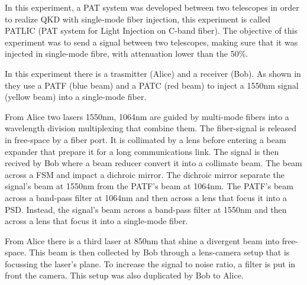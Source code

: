In this experiment, a PAT system was developed between two telescopes in order to realize QKD with single-mode fiber injection, this experiment is called PATLIC (PAT system for Light Injection on C-band fiber).
The objective of this experiment was to send a signal between two telescopes, making sure that it was injected in single-mode fibre, with attenuation lower than the 50\%.

In this experiment there is a trasmitter (Alice) and a receiver (Bob). As shown in  they use a PATF (blue beam) and a PATC (red beam) to inject a 1550nm signal (yellow beam) into a single-mode fiber.

From Alice two lasers 1550nm, 1064nm are guided by multi-mode fibers into a wavelength division multiplexing that combine them. The fiber-signal is released in free-space by a fiber port. It is collimated by a lens before entering a beam expander that prepare it for a long communications link. The signal is then recived by Bob where a beam reducer convert it into a collimate beam. The beam across a FSM and impact a dichroic mirror. The dichroic mirror separate the signal's beam at 1550nm from the PATF's beam at 1064nm. The PATF's beam across a band-pass filter at 1064nm and then across a lens that focus it into a PSD. Instead, the signal's beam across a band-pass filter at 1550nm and then across a lens that focus it into a single-mode fiber.

From Alice there is a third laser at 850nm that shine a divergent beam into free-space. This beam is then collected by Bob through a lens-camera setup that is focussing the laser's plane. To increase the signal to noise ratio, a filter is put in front the camera. This setup was also duplicated by Bob to Alice.

